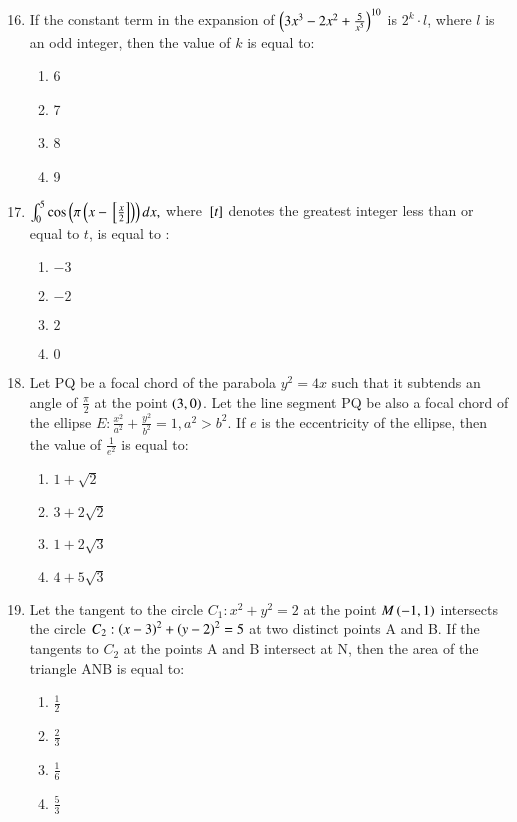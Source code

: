 \documentclass[journal,9pt,onecolumn]{IEEEtran}
\begin{document}
\begin{enumerate}
\setcounter{enumi}{15}
\item If the constant term in the expansion of $\left( 3x^3 - 2x^2 + \frac{5}{x^5} \right)^{10}$ is $2^k \cdot l$, where $l$ is an odd integer, then the value of $k$ is equal to:
\begin{multicols}{4}    
\begin{enumerate}
    \item 6
    \item 7
    \item 8
    \item 9
\end{enumerate}
\end{multicols}

\item $\int_{0}^{5} \cos \left(\pi \left( x - {}\left[ \frac{x}{2}\right] \right) \right) dx,$ where ${}\left[ t\right] $ denotes the greatest integer less than or equal to $t$, is equal to :
\begin{multicols}{4}    
\begin{enumerate}
    \item $-3$
    \item $-2$
    \item $2$
    \item $0$
\end{enumerate}
\end{multicols}

\item Let PQ be a focal chord of the parabola $y^2 = 4x$ such that it subtends an angle of $\frac{\pi}{2}$ at the point $\left(3, 0\right)$. Let the line segment PQ be also a focal chord of the ellipse $E: \frac{x^2}{a^2} + \frac{y^2}{b^2} = 1, a^2 > b^2$. If $e$ is the eccentricity of the ellipse, then the value of $\frac{1}{e^2}$ is equal to:
\begin{multicols}{4}
\begin{enumerate}
    \item $1 + \sqrt{2}$
    \item $3 + 2\sqrt{2}$
    \item $1 + 2\sqrt{3}$
    \item $4 + 5\sqrt{3}$
\end{enumerate}
\end{multicols}

\item Let the tangent to the circle $C_1: x^2+y^2=2$ at the point $M\left(-1,1\right)$ intersects the circle $C_2: \left(x-3\right)^2+\left(y-2\right)^2=5$ at two distinct points A and B. If the tangents to $C_2$ at the points A and B intersect at N, then the area of the triangle ANB is equal to:
\begin{multicols}{4}
\begin{enumerate}
\item $\frac{1}{2}$
\item $\frac{2}{3}$
\item  $\frac{1}{6}$
\item $\frac{5}{3}$
\end{enumerate}
\end{multicols}


\end{enumerate}
\end{document}
